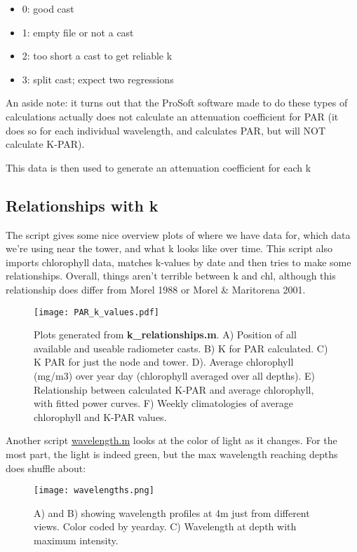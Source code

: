 \documentclass[11pt]{article}
\begin{document}
\begin{itemize}
\item 0: good cast
\item 1: empty file or not a cast
\item 2: too short a cast to get reliable k
\item 3: split cast; expect two regressions
\end{itemize}

\noindent An aside note: it turns out that the ProSoft software made to do these types of calculations actually does not calculate an attenuation coefficient for PAR (it does so for each individual wavelength, and calculates PAR, but will NOT calculate K-PAR). 

This data is then used to generate an attenuation coefficient for each k 



\subsection{Relationships with k}

The script  gives some nice overview plots of where we have data for, which data we're using near the tower, and what k looks like over time. This script also imports chlorophyll data, matches k-values by date and then tries to make some relationships. Overall, things aren't terrible between k and chl, although this relationship does differ from Morel 1988 or Morel \& Maritorena 2001.

 
 \begin{figure}[h]
\centering
\texttt{[image: PAR\_k\_values.pdf]}
\caption{Plots generated from \textbf{k\_relationships.m}. A) Position of all available and useable radiometer casts. B) K for PAR calculated. C) K PAR for just the node and tower. D). Average chlorophyll (mg/m3) over year day (chlorophyll averaged over all depths). E) Relationship between calculated K-PAR and average chlorophyll, with fitted power curves. F) Weekly climatologies of average chlorophyll and K-PAR values.}
\end{figure}

\clearpage

Another script \url{wavelength.m} looks at the color of light as it changes. For the most part, the light is indeed green, but the max wavelength reaching depths does shuffle about:
 \begin{figure}[h]
\centering
\texttt{[image: wavelengths.png]}
\caption{A) and B) showing wavelength profiles at 4m just from different views. Color coded by yearday. C) Wavelength at depth with maximum intensity.}
\end{figure}
\end{document}
